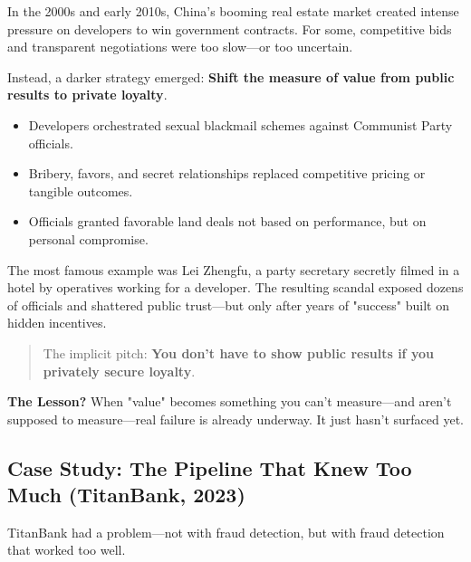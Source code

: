 \begin{tcolorbox}[colback=blue!5!white, colframe=blue!50!black,
  title={Historical Sidebar: When ROI Becomes Loyalty --- China's Real Estate Blackmail Scandals}]

In the 2000s and early 2010s, China's booming real estate market created intense pressure on developers to win government contracts.  
For some, competitive bids and transparent negotiations were too slow—or too uncertain.

\medskip

Instead, a darker strategy emerged:  
\textbf{Shift the measure of value from public results to private loyalty}.

\medskip

\begin{itemize}
    \item Developers orchestrated sexual blackmail schemes against Communist Party officials.
    \item Bribery, favors, and secret relationships replaced competitive pricing or tangible outcomes.
    \item Officials granted favorable land deals not based on performance, but on personal compromise.
\end{itemize}

\medskip

The most famous example was Lei Zhengfu, a party secretary secretly filmed in a hotel by operatives working for a developer.  
The resulting scandal exposed dozens of officials and shattered public trust—but only after years of "success" built on hidden incentives.

\medskip

\begin{quote}
The implicit pitch: \textbf{You don't have to show public results if you privately secure loyalty}.
\end{quote}

\medskip

\textbf{The Lesson?} When "value" becomes something you can't measure—and aren't supposed to measure—real failure is already underway. It just hasn't surfaced yet.
\end{tcolorbox}

\subsection{Case Study: The Pipeline That Knew Too Much (TitanBank, 2023)}

TitanBank had a problem—not with fraud detection, but with fraud detection that worked too well.

